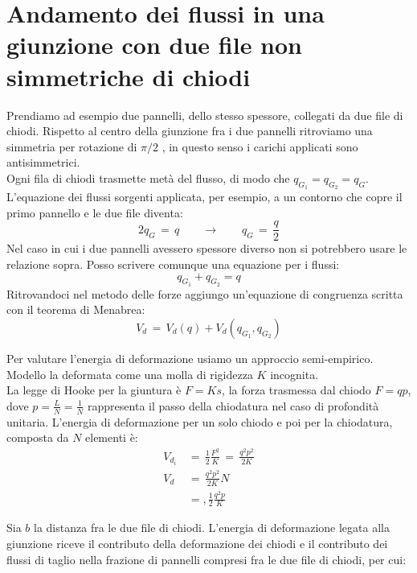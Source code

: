 \section{Andamento dei flussi in una giunzione con due file non simmetriche di chiodi}

Prendiamo ad esempio due pannelli, dello stesso spessore, collegati da due file di chiodi. Rispetto al centro della giunzione fra i due pannelli ritroviamo una simmetria per rotazione di $\pi/2$ , in questo senso i carichi applicati sono antisimmetrici.\\
Ogni fila di chiodi trasmette metà del flusso, di modo che $q_{G_1}=q_{G_2} = q_G$.\\
L'equazione dei flussi sorgenti applicata, per esempio, a un contorno che copre il primo pannello e le due file diventa:
\begin{equation*}
    2q_G\,=\,q  \qquad\rightarrow\qquad q_G\,=\,\frac{q}{2}
\end{equation*}
Nel caso in cui i due pannelli avessero spessore diverso non si potrebbero usare le relazione sopra. Posso scrivere comunque una equazione per i flussi:
\begin{equation*}
   q_{G_1}+q_{G_2} = q
\end{equation*}
Ritrovandoci nel metodo delle forze aggiungo un'equazione di congruenza scritta con il teorema di Menabrea:
\begin{equation*}
    V_d\,=\, V_d(q) +V_d(q_{G_1},q_{G_2} )
\end{equation*}

Per valutare l'energia di deformazione usiamo un approccio semi-empirico. Modello la deformata come una molla di rigidezza $K$ incognita.\\


La legge di Hooke per la giuntura è $F=Ks$, la forza trasmessa dal chiodo $F=qp$, dove $p=\frac{L}{N}=\frac{1}{N}$ rappresenta il passo della chiodatura nel caso di profondità unitaria. L'energia di deformazione per un solo chiodo e poi per la chiodatura, composta da $N$ elementi è:
\begin{align*}
    V_{d_i}\,&=\,\frac{1}{2}\frac{F^2}{K}\,=\,\frac{q^2p^2}{2K}\\
      V_{d}\,&=\,\frac{q^2p^2}{2K}N\\
            &= ,\frac{1}{2}\frac{q^2p}{K}\,
\end{align*}

Sia $b$ la distanza fra le due file di chiodi. L'energia di deformazione legata alla giunzione riceve il contributo della deformazione dei chiodi e il contributo dei flussi di taglio nella frazione di pannelli compresi fra le due file di chiodi, per cui:


